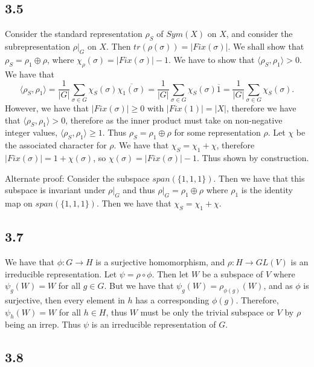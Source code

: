 \documentclass[]{article}
\begin{document}
\subsection*{3.5}
Consider the standard representation $\rho_S$ of $Sym(X)$ on $X$, and consider the subrepresentation $\rho |_G$ on $X$. Then $tr(\rho(\sigma)) = |Fix(\sigma)|$. 
We shall show that $\rho_S = \rho_1 \oplus \rho$, where $\chi_\rho(\sigma) = |Fix(\sigma)| - 1$. We have to show that $\langle \rho_S, \rho_1 \rangle > 0$. We have that 
\begin{equation}
	\langle \rho_S, \rho_1 \rangle = \frac{1}{|G|} \sum_{\sigma \in G} \chi_S(\sigma) \overline{\chi_1(\sigma)} = \frac{1}{|G|} \sum_{\sigma \in G} \chi_S(\sigma) \overline{1} = \frac{1}{|G|} \sum_{\sigma \in G} \chi_S(\sigma).
\end{equation}
However, we have that $|Fix(\sigma)| \geq 0$ with $|Fix(1)| = |X|$, therefore we have that $ \langle \rho_S, \rho_1 \rangle > 0$, therefore as the inner product must take on non-negative integer values, $\langle \rho_S, \rho_1 \rangle \geq 1$. Thus $\rho_S = \rho_1 \oplus \rho$ for some representation $\rho$. 
Let $\chi$ be the associated character for $\rho$. 
 We have that $\chi_S = \chi_1 + \chi$, therefore $|Fix(\sigma)| = 1 + \chi(\sigma)$, so $\chi(\sigma) = |Fix(\sigma)| - 1$. Thus shown by construction.
 
Alternate proof: Consider the subspace $span\left(\lbrace 1, 1, 1 \rbrace\right)$. Then we have that this subspace is invariant under $\rho|_G$ and thus $\rho|_G = \rho_1 \oplus \rho$ where $\rho_1$ is the identity map on $span\left(\lbrace 1, 1, 1 \rbrace\right)$. Then we have that $\chi_S = \chi_1 + \chi$. 

\subsection*{3.7}
We have that $\phi: G \rightarrow H$ is a surjective homomorphism, and $\rho: H \rightarrow GL(V)$ is an irreducible representation. Let $\psi =  \rho \circ \phi$. Then let $W$ be a subspace of $V$ where $\psi_g(W) = W$ for all $g \in G$. But we have that $\psi_g(W) = \rho_{\phi(g)}(W)$, and as $\phi$ is surjective, then every element in $h$ has a corresponding $\phi(g)$. Therefore, $\psi_h(W) = W$ for all $h \in H$, thus $W$ must be only the trivial subspace or $V$ by $\rho$ being an irrep. Thus $\psi$ is an irreducible representation of $G$.
\subsection*{3.8}
\end{document}
